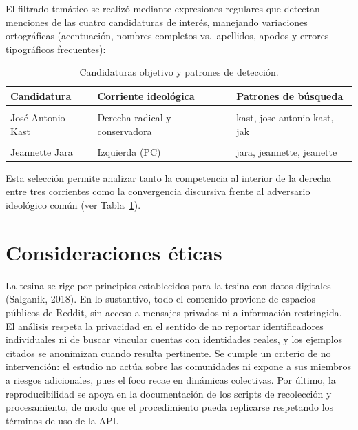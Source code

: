 \documentclass[
  letterpaper,
  numbers=noendperiod,
  fontsize=11pt,
  DIV=12,
  titlepage=false]{scrreprt}
\begin{document}
El filtrado temático se realizó mediante expresiones regulares que
detectan menciones de las cuatro candidaturas de interés, manejando
variaciones ortográficas (acentuación, nombres completos vs.~apellidos,
apodos y errores tipográficos frecuentes):

\begin{longtable}[t]{lll}

\caption{\label{tbl-candidaturas}Candidaturas objetivo y patrones de
detección.}

\tabularnewline

\toprule
Candidatura & Corriente ideológica & Patrones de búsqueda\\
\midrule
\cellcolor{gray!10}{Evelyn Matthei} & \cellcolor{gray!10}{Derecha tradicional} & \cellcolor{gray!10}{matthei, matei, evelyn}\\
José Antonio Kast & Derecha radical y conservadora & kast, jose antonio kast, jak\\
\cellcolor{gray!10}{Johannes Kaiser} & \cellcolor{gray!10}{Derecha libertaria} & \cellcolor{gray!10}{kaiser, johannes, jkaiser}\\
Jeannette Jara & Izquierda (PC) & jara, jeannette, jeanette\\
\bottomrule

\end{longtable}

Esta selección permite analizar tanto la competencia al interior de la
derecha entre tres corrientes como la convergencia discursiva frente al
adversario ideológico común (ver Tabla~\ref{tbl-candidaturas}).

\section{Consideraciones éticas}\label{consideraciones-uxe9ticas}

La tesina se rige por principios establecidos para la tesina con datos
digitales (Salganik, 2018). En lo sustantivo, todo el contenido proviene
de espacios públicos de Reddit, sin acceso a mensajes privados ni a
información restringida. El análisis respeta la privacidad en el sentido
de no reportar identificadores individuales ni de buscar vincular
cuentas con identidades reales, y los ejemplos citados se anonimizan
cuando resulta pertinente. Se cumple un criterio de no intervención: el
estudio no actúa sobre las comunidades ni expone a sus miembros a
riesgos adicionales, pues el foco recae en dinámicas colectivas. Por
último, la reproducibilidad se apoya en la documentación de los scripts
de recolección y procesamiento, de modo que el procedimiento pueda
replicarse respetando los términos de uso de la API.
\end{document}
